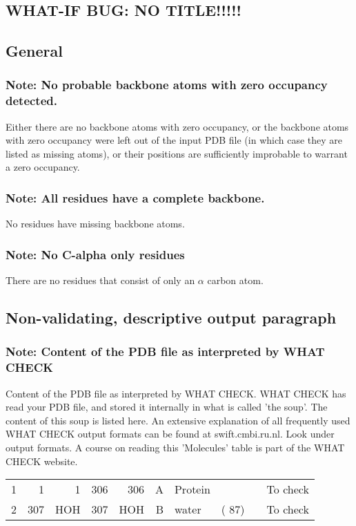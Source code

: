 \documentclass[a4paper]{article}
\def\showsect#1{
  \thesect\gdef\thesect{}
  \thessect\gdef\thessect{}
  \subsubsection{#1}
}
\def\ssect#1{
  \gdef\thessect{\subsection{#1}}
}
\gdef\thesect{\pagebreak[2]\section{WHAT-IF BUG: NO TITLE!!!!!}}
\gdef\thessect{\subsection{General}}
\begin{document}
\begin{note}
\showsect{Note: No probable backbone atoms with zero occupancy detected.}
Either there are no backbone atoms with zero occupancy, or the backbone
atoms with zero occupancy were left out of the input PDB file (in
which case they are listed as missing atoms), or their positions are
sufficiently improbable to warrant a zero occupancy.
\end{note}

\begin{note}
\showsect{Note: All residues have a complete backbone.}
No residues have missing backbone atoms.
\end{note}

\begin{note}
\showsect{Note: No C-alpha only residues}
There are no residues that consist of only an $\alpha$ carbon atom.
\end{note}

\ssect{Non-validating, descriptive output paragraph}
\begin{note}
\showsect{Note: Content of the PDB file as interpreted by WHAT CHECK}
Content of the PDB file as interpreted by WHAT CHECK.
WHAT CHECK has read your PDB file, and stored it internally in what is called
'the soup'. The content of this soup is listed here. An extensive explanation
of all frequently used WHAT CHECK output formats can be found at
swift.cmbi.ru.nl. Look under output formats. A course on reading this
'Molecules' table is part of the WHAT CHECK website.
 
\begin{center}
 
\begin{supertabular}{rr@{ (}r@{) }r@{ (}r@{) }rlrrl}
     1&    1&    1&  306&  306&A&Protein&        &  &To check\\
     2&  307& HOH &  307& HOH &B&water  &(   87) &  &To check\\
\end{supertabular}\end{center}
\end{note}
\end{document}
